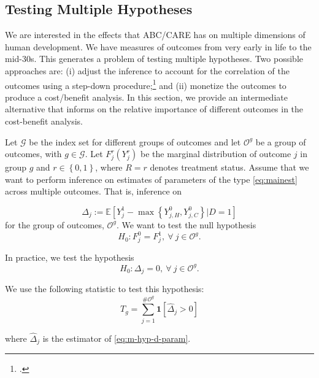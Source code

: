 \subsection{Testing Multiple Hypotheses}  \label{section:counts}

We are interested in the effects that ABC/CARE has on multiple dimensions of human development. We have measures of outcomes from very early in life to the mid-30s. This generates a problem of testing multiple hypotheses. Two possible approaches are: (i) adjust the inference to account for the correlation of the outcomes using a step-down procedure;\footnote{\citet{Lehman_Romano_2005_AnnStat,Romano_Shaikh_2006_AnnStat}.} and (ii) monetize the outcomes to produce a cost/benefit analysis. In this section, we provide an intermediate alternative that informs on the relative importance of different outcomes in the cost-benefit analysis.

Let $\mathcal{G}$ be the index set for different groups of outcomes and let $\mathcal{O}^{g}$ be a group of outcomes, with $g \in \mathcal{G}$. Let $F_{j}^r \left( Y_{j}^r \right) $ be the marginal distribution of outcome $j$ in group $g$ and $r \in \left\{ 0,1 \right\}$, where $R = r$ denotes treatment status. Assume that we want to perform inference on estimates of parameters of the type \eqref{eq:mainest} across multiple outcomes. That is, inference on

\begin{equation}
\Delta_{j} := \mathbb{E} \left[ Y_{j}^1 -  \max \left\{  Y_{j,H}^0 ,  Y_{j,C}^0 \right\} | D =1 \right] \label{eq:m-hyp-d-param}
\end{equation}
for the group of outcomes, $\mathcal{O}^{g}$. We want to test the null hypothesis
\begin{equation}
H_{0} : F_{j}^0 = F_{j}^1, \ \forall \ j \in \mathcal{O}^{g}.
\end{equation}

\noindent In practice, we test the hypothesis
\begin{equation}
H_{0} : \Delta_{j} = 0, \ \forall \ j \in \mathcal{O}^{g}.
\end{equation}

\noindent We use the following statistic to test this hypothesis:
\begin{equation}
T_{g} = \sum _{j=1}^{\# \mathcal{O}^g} \mathbf{1} \left[ \widehat{\Delta}_{j} > 0\right] \label{eq:count}
\end{equation}

\noindent where $\widehat{\Delta}_{j}$ is the estimator of \eqref{eq:m-hyp-d-param}.

